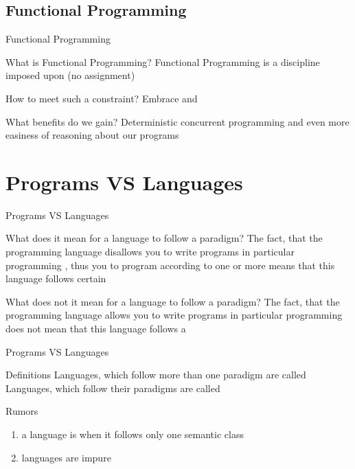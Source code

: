 \subsection{Functional Programming}
\begin{frame}{Functional Programming}
\begin{block}{What is Functional Programming?}
Functional Programming is a discipline imposed upon  (no
assignment)
\end{block}
\pause
\begin{block}{How to meet such a constraint?}
Embrace  and 
\end{block}
\pause
\begin{block}{What benefits do we gain?}
Deterministic concurrent programming and even more easiness of
reasoning about our programs
\end{block}
\end{frame}

\section{Programs VS Languages}
\begin{frame}{Programs VS Languages}
\begin{block}{What does it mean for a language to follow a paradigm?}
The fact, that the programming language \alert{disallows} you to write programs
in particular programming , thus  you to
program according to one or more  means that this
language follows certain 
\end{block}
\pause
\begin{alertblock}{What does not it mean for a language to follow a paradigm?}
The fact, that the programming language \alert{allows} you to write programs in
particular programming  does not mean that this language
follows a 
\end{alertblock}
\end{frame}

\begin{frame}{Programs VS Languages}
\begin{block}{Definitions}
Languages, which follow more than one paradigm are called \\
Languages, which follow their paradigms  are called
\\
\end{block}
\pause
\begin{alertblock}{Rumors}
\begin{enumerate}
\item a language is  when it follows \alert{only one} semantic
class
\item {} languages are \alert{impure}
\end{enumerate}
\end{alertblock}
\end{frame}

